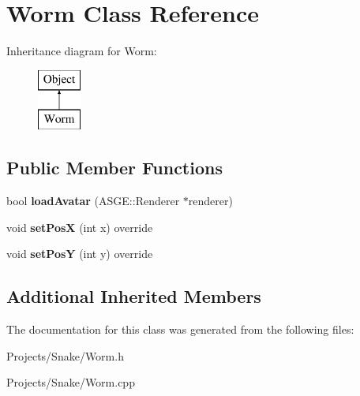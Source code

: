 \hypertarget{class_worm}{}\section{Worm Class Reference}
\label{class_worm}
Inheritance diagram for Worm\+:\begin{figure}[H]
\begin{center}
\leavevmode
\includegraphics[height=2.000000cm]{class_worm}
\end{center}
\end{figure}
\subsection*{Public Member Functions}
\begin{DoxyCompactItemize}
\item 
\mbox{\label{class_worm_ace7384431bf9b69bb12c06b5b563fa0a}} 
bool {\bfseries load\+Avatar} (A\+S\+G\+E\+::\+Renderer $\ast$renderer)
\item 
\mbox{\label{class_worm_a0b162f66e546cd3a028d33d43386e05f}} 
void {\bfseries set\+PosX} (int x) override
\item 
\mbox{\label{class_worm_a543c2f452ff3c6d4567e21a77e4153ca}} 
void {\bfseries set\+PosY} (int y) override
\end{DoxyCompactItemize}
\subsection*{Additional Inherited Members}


The documentation for this class was generated from the following files\+:\begin{DoxyCompactItemize}
\item 
Projects/\+Snake/Worm.\+h\item 
Projects/\+Snake/Worm.\+cpp\end{DoxyCompactItemize}
